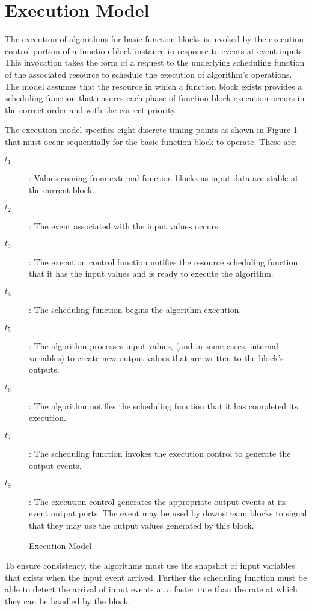 \section{Execution Model}
The execution of algorithms for basic function blocks is
invoked by the execution control portion of a function block
instance in response to events at event inputs. This
invocation takes the form of a request to the underlying
scheduling function of the associated resource to schedule
the execution of algorithm's operations. The model assumes
that the resource in which a function block exists provides
a scheduling function that ensures each phase of function
block execution occurs in the correct order and with the
correct priority.

The execution model specifies eight discrete timing points
as shown in Figure \ref{f:Execution_Model} that must occur
sequentially for the basic function block to operate. These
are:

\begin{description}
\item[$t_1$]: Values coming from external function blocks as
  input data are stable at the current block.
\item[$t_2$]: The event associated with the input values
  occurs.
\item[$t_3$]: The execution control function notifies the
  resource scheduling function that it has the input values
  and is ready to execute the algorithm.
\item[$t_4$]: The scheduling function begins the algorithm
  execution.
\item[$t_5$]: The algorithm processes input values, (and in
  some cases, internal variables) to create new output
  values that are written to the block's outputs.
\item[$t_6$]: The algorithm notifies the scheduling function
  that it has completed its execution.
\item[$t_7$]: The scheduling function invokes the execution
  control to generate the output events.
\item[$t_8$]: The execution control generates the
  appropriate output events at its event output ports. The
  event may be used by downstream blocks to signal that they
  may use the output values generated by this block.
\end{description}

\begin{figure}
  \begin{center}
    \caption[Execution Model]
            {Execution Model{\protect ~\cite{iec:614991:2000}}}
    \label{f:Execution_Model}
  \end{center}
\end{figure}

To ensure consistency, the algorithms must use the snapshot
of input variables that exists when the input event arrived.
Further the scheduling function must be able to detect the
arrival of input events at a faster rate than the rate at
which they can be handled by the block.
